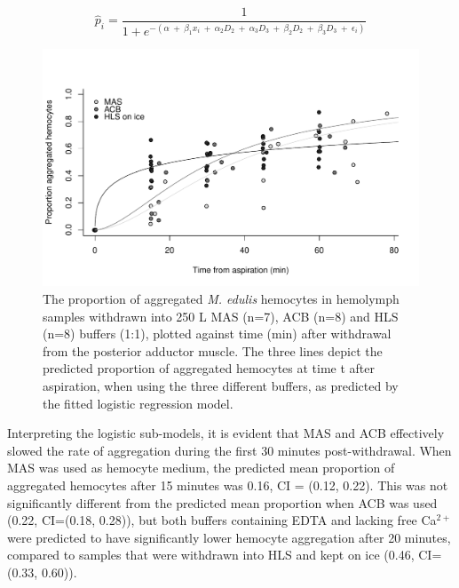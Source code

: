 \begin{equation}
\label{eq:logit}
\hat{p}_{i} = \dfrac{1}{1 + e^{-(\alpha \: + \: \beta_{1} x_{i} \: + \: \alpha_{2} D_{2} \: + \: \alpha_{3} D_{3} \: + \: \beta_{2} D_{2} \: + \: \beta_{3} D_{3} \: + \: \epsilon_{i})}}
\end{equation}

\begin{figure}[!ht]
    \centering
    \includegraphics[width=1.0\textwidth]{figures/Method development/prop_agg.pdf}
    \caption{The proportion of aggregated \emph{M. edulis} hemocytes in hemolymph samples withdrawn into 250 \micro L MAS (n=7), ACB (n=8) and HLS (n=8) buffers (1:1), plotted against time (min) after withdrawal from the posterior adductor muscle. The three lines depict the predicted proportion of aggregated hemocytes at time t after aspiration, when using the three different buffers, as predicted by the fitted logistic regression model.}
    \label{fig:aggregation}
\end{figure}

Interpreting the logistic sub-models, it is evident that MAS and ACB effectively slowed the rate of aggregation during the first 30 minutes post-withdrawal. When MAS was used as hemocyte medium, the predicted mean proportion of aggregated hemocytes after 15 minutes was 0.16, CI = (0.12, 0.22). This was not significantly different from the predicted mean proportion when ACB was used (0.22, CI=(0.18, 0.28)), but both buffers containing EDTA and lacking free Ca$^{2+}$ were predicted to have significantly lower hemocyte aggregation after 20 minutes, compared to samples that were withdrawn into HLS and kept on ice (0.46, CI=(0.33, 0.60)).

